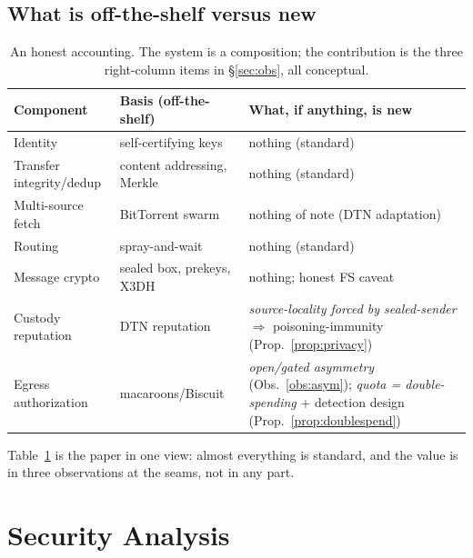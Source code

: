 \documentclass[11pt]{article}
\begin{document}
\subsection{What is off-the-shelf versus new}\label{sub:composition}

\begin{table}[t]\centering\small
\begin{tabular}{@{}p{3.4cm}p{4.4cm}p{4.8cm}@{}}
\toprule
\textbf{Component} & \textbf{Basis (off-the-shelf)} & \textbf{What, if anything, is new}\\
\midrule
Identity & self-certifying keys & nothing (standard)\\
Transfer integrity/dedup & content addressing, Merkle~\cite{benet2014ipfs,merkle1987digsig} & nothing (standard)\\
Multi-source fetch & BitTorrent swarm~\cite{cohen2003bittorrent} & nothing of note (DTN adaptation)\\
Routing & spray-and-wait~\cite{spyropoulos2005sprayandwait} & nothing (standard)\\
Message crypto & sealed box, prekeys, X3DH~\cite{marlinspike2016x3dh} & nothing; honest FS caveat\\
Custody reputation & DTN reputation & \emph{source-locality forced by sealed-sender} $\Rightarrow$ poisoning-immunity (Prop.~\ref{prop:privacy})\\
Egress authorization & macaroons/Biscuit~\cite{birgisson2014macaroons,biscuit2021} & \emph{open/gated asymmetry} (Obs.~\ref{obs:asym}); \emph{quota = double-spending} + detection design (Prop.~\ref{prop:doublespend})\\
\bottomrule
\end{tabular}
\caption{An honest accounting. The system is a composition; the contribution is
the three right-column items in \S\ref{sec:obs}, all conceptual.}
\label{tab:composition}
\end{table}

Table~\ref{tab:composition} is the paper in one view: almost everything is
standard, and the value is in three observations at the seams, not in any part.

\section{Security Analysis}\label{sec:security}
\end{document}
